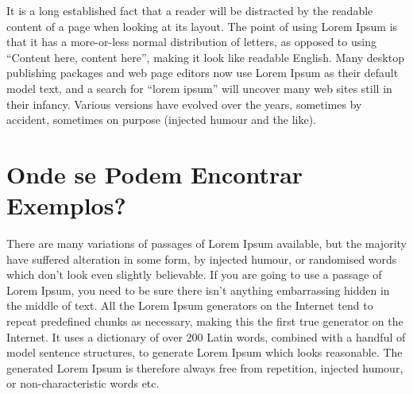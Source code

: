 It is a long established fact that a reader will be distracted by the
readable content of a page when looking at its layout. The point of
using Lorem Ipsum is that it has a more-or-less normal distribution of
letters, as opposed to using ``Content here, content here'', making it
look like readable English. Many desktop publishing packages and web
page editors now use Lorem Ipsum as their default model text, and a
search for ``lorem ipsum'' will uncover many web sites still in their
infancy. Various versions have evolved over the years, sometimes by
accident, sometimes on purpose (injected humour and the like). 

\section{Onde se Podem Encontrar Exemplos?}

There are many variations of passages of Lorem Ipsum available, but
the majority have suffered alteration in some form, by injected
humour, or randomised words which don't look even slightly
believable. If you are going to use a passage of Lorem Ipsum, you need
to be sure there isn't anything embarrassing hidden in the middle of
text. All the Lorem Ipsum generators on the Internet tend to repeat
predefined chunks as necessary, making this the first true generator
on the Internet. It uses a dictionary of over 200 Latin words,
combined with a handful of model sentence structures, to generate
Lorem Ipsum which looks reasonable. The generated Lorem Ipsum is
therefore always free from repetition, injected humour, or
non-characteristic words etc. 